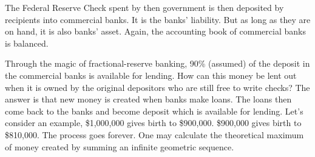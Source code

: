 \documentclass[a4paper]{report}
\begin{document}
The Federal Reserve Check spent by then government is then deposited by recipients into commercial banks. It is the banks' liability. But as long as they are on hand, it is also banks' asset. Again, the accounting book of commercial banks is balanced.

Through the magic of fractional-reserve banking, 90\% (assumed) of the deposit in the commercial banks is available for lending. How can this money be lent out when it is owned by the original depositors who are still free to write checks? The answer is that new money is created when banks make loans. The loans then come back to the banks and become deposit which is available for lending. Let's consider an example, \$1,000,000 gives birth to \$900,000. \$900,000 gives birth to \$810,000. The process goes forever. One may calculate the theoretical maximum of money created by summing an infinite geometric sequence.
\end{document}
